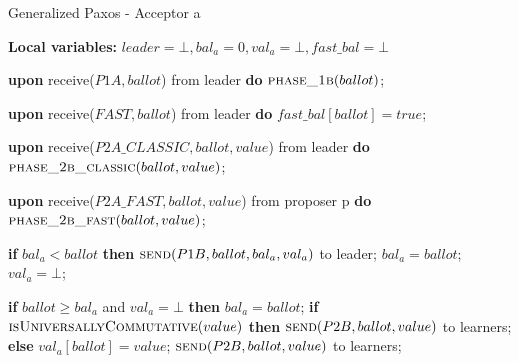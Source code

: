 \begin{algorithm} 
	\caption{Generalized Paxos - Acceptor a}
	\label{CFT-Acc}
	\textbf{Local variables:} $leader = \bot, bal_a = 0,val_a = \bot,fast\_bal = \bot$
	\begin{algorithmic}[1]
		\State \textbf{upon} receive($P1A, ballot$) from leader \textbf{do}
		\State \hspace{\algorithmicindent} $\Call{phase\_1b}{ballot}$;
		
		\State
		\State \textbf{upon} receive($FAST,ballot$) from leader \textbf{do}
		\State \hspace{\algorithmicindent} $fast\_bal[ballot] = true$;
		
		\State
		\State \textbf{upon} receive($P2A\_CLASSIC, ballot, value$) from leader \textbf{do}
		\State \hspace{\algorithmicindent} $\Call{phase\_2b\_classic}{ballot, value}$; 
		
		\State		
		\State \textbf{upon} receive($P2A\_FAST,ballot,value$) from proposer p \textbf{do}
		\State \hspace{\algorithmicindent} $\Call{phase\_2b\_fast}{ballot, value}$;
		
		\State
		\State \textbf{if} $bal_a < ballot$ \textbf{then}
		\State \hspace{\algorithmicindent} $\Call{send}{P1B, ballot, bal_a, val_a}$ to leader;
		\State \hspace{\algorithmicindent} $bal_a = ballot$;	
		\State \hspace{\algorithmicindent} $val_a = \bot$;	

		\EndFunction
		
		\State
		\State \textbf{if} $ballot \geq bal_a$ and $val_a = \bot$ \textbf{then}
		\State \hspace{\algorithmicindent} $bal_a = ballot$;
		\State \hspace{\algorithmicindent} \textbf{if} $\Call{isUniversallyCommutative}{value}$ \textbf{then}
		\State \hspace{\algorithmicindent}\hspace{\algorithmicindent} $\Call{send}{P2B, ballot, value}$ to learners;
		\State \hspace{\algorithmicindent}\textbf{else}
		\State \hspace{\algorithmicindent}\hspace{\algorithmicindent} $val_a[ballot] = value$;
		\State \hspace{\algorithmicindent}\hspace{\algorithmicindent} $\Call{send}{P2B, ballot, value}$ to learners;
		\EndFunction
		

\end{algorithmic}
\end{algorithm}
